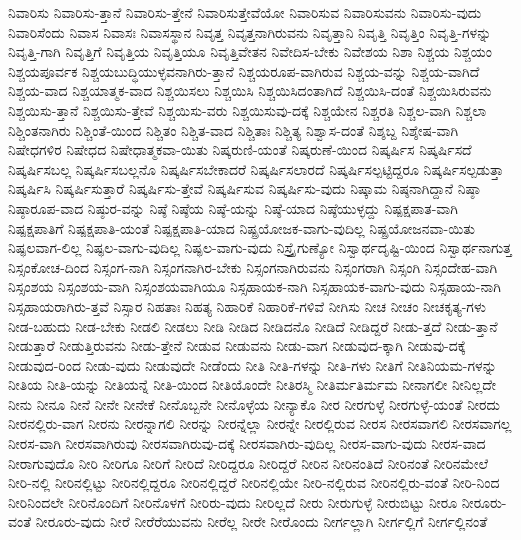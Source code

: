 {ನಿವಾರಿಸು
ನಿವಾರಿಸು-ತ್ತಾನೆ
ನಿವಾರಿಸು-ತ್ತೇನೆ
ನಿವಾರಿಸುತ್ತೇವೆಯೋ
ನಿವಾರಿಸುವ
ನಿವಾರಿಸುವನು
ನಿವಾರಿಸು-ವುದು
ನಿವಾರಿಸೆಂದು
ನಿವಾಸ
ನಿವಾಸಃ
ನಿವಾಸಸ್ಥಾನ
ನಿವೃತ್ತ
ನಿವೃತ್ತನಾಗಿರುವನು
ನಿವೃತ್ತಾನಿ
ನಿವೃತ್ತಿ
ನಿವೃತ್ತಿಂ
ನಿವೃತ್ತಿ-ಗಳನ್ನು
ನಿವೃತ್ತಿ-ಗಾಗಿ
ನಿವೃತ್ತಿಗೆ
ನಿವೃತ್ತಿಯ
ನಿವೃತ್ತಿಯೂ
ನಿವೃತ್ತಿವೇತನ
ನಿವೇದಿಸ-ಬೇಕು
ನಿವೇಶಯ
ನಿಶಾ
ನಿಶ್ಚಯ
ನಿಶ್ಚಯಂ
ನಿಶ್ಚಯಪೂರ್ವಕ
ನಿಶ್ಚಯಬುದ್ಧಿಯುಳ್ಳವನಾಗಿರು-ತ್ತಾನೆ
ನಿಶ್ಚಯರೂಪ-ವಾಗಿರುವ
ನಿಶ್ಚಯ-ವನ್ನು
ನಿಶ್ಚಯ-ವಾಗಿದೆ
ನಿಶ್ಚಯ-ವಾದ
ನಿಶ್ಚಯಾತ್ಮಕ-ವಾದ
ನಿಶ್ಚಯಿಸಲು
ನಿಶ್ಚಯಿಸಿ
ನಿಶ್ಚಯಿಸಿದಂತಾಗಿದೆ
ನಿಶ್ಚಯಿಸಿ-ದಂತೆ
ನಿಶ್ಚಯಿಸಿರುವನು
ನಿಶ್ಚಯಿಸು-ತ್ತಾನೆ
ನಿಶ್ಚಯಿಸು-ತ್ತೇವೆ
ನಿಶ್ಚಯಿಸು-ವರು
ನಿಶ್ಚಯಿಸುವು-ದಕ್ಕೆ
ನಿಶ್ಚಯೇನ
ನಿಶ್ಚರತಿ
ನಿಶ್ಚಲ-ವಾಗಿ
ನಿಶ್ಚಲಾ
ನಿಶ್ಚಿಂತನಾಗಿರು
ನಿಶ್ಚಿಂತೆ-ಯಿಂದ
ನಿಶ್ಚಿತಂ
ನಿಶ್ಚಿತ-ವಾದ
ನಿಶ್ಚಿತಾಃ
ನಿಶ್ಚಿತ್ಯ
ನಿಶ್ವಾಸ-ದಂತೆ
ನಿಶ್ಶಬ್ದ
ನಿಶ್ಶೇಷ-ವಾಗಿ
ನಿಷೇಧಗಳಿರ
ನಿಷೇಧದ
ನಿಷೇಧಾತ್ಮಕವಾ-ಯಿತು
ನಿಷ್ಕರುಣಿ-ಯಂತೆ
ನಿಷ್ಕರುಣೆ-ಯಿಂದ
ನಿಷ್ಕರ್ಷಿಸ
ನಿಷ್ಕರ್ಷಿಸದೆ
ನಿಷ್ಕರ್ಷಿಸಬಲ್ಲ
ನಿಷ್ಕರ್ಷಿಸಬಲ್ಲನೊ
ನಿಷ್ಕರ್ಷಿಸಬೇಕಾದರೆ
ನಿಷ್ಕರ್ಷಿಸಲಾರದೆ
ನಿಷ್ಕರ್ಷಿಸಲ್ಪಟ್ಟಿದ್ದರೂ
ನಿಷ್ಕರ್ಷಿಸಲ್ಪಡುತ್ತಾ
ನಿಷ್ಕರ್ಷಿಸಿ
ನಿಷ್ಕರ್ಷಿಸುತ್ತಾರೆ
ನಿಷ್ಕರ್ಷಿಸು-ತ್ತೇವೆ
ನಿಷ್ಕರ್ಷಿಸುವ
ನಿಷ್ಕರ್ಷಿಸು-ವುದು
ನಿಷ್ಕಾಮ
ನಿಷ್ಠನಾಗಿದ್ದಾನೆ
ನಿಷ್ಠಾ
ನಿಷ್ಠಾರೂಪ-ವಾದ
ನಿಷ್ಠುರ-ವನ್ನು
ನಿಷ್ಠೆ
ನಿಷ್ಠೆಯ
ನಿಷ್ಠೆ-ಯನ್ನು
ನಿಷ್ಠೆ-ಯಾದ
ನಿಷ್ಠೆಯುಳ್ಳದ್ದು
ನಿಷ್ಪಕ್ಷಪಾತ-ವಾಗಿ
ನಿಷ್ಪಕ್ಷಪಾತಿಗೆ
ನಿಷ್ಪಕ್ಷಪಾತಿ-ಯಂತೆ
ನಿಷ್ಪಕ್ಷಪಾತಿ-ಯಾದ
ನಿಷ್ಪ್ರಯೋಜಕ-ವಾಗು-ವುದಿಲ್ಲ
ನಿಷ್ಪ್ರಯೋಜನವಾ-ಯಿತು
ನಿಷ್ಫಲವಾಗ-ಲಿಲ್ಲ
ನಿಷ್ಫಲ-ವಾಗು-ವುದಿಲ್ಲ
ನಿಷ್ಫಲ-ವಾಗು-ವುದು
ನಿಸ್ತ್ರೈಗುಣ್ಯೋ
ನಿಸ್ವಾರ್ಥದೃಷ್ಟಿ-ಯಿಂದ
ನಿಸ್ವಾರ್ಥನಾಗುತ್ತ
ನಿಸ್ಸಂಕೋಚ-ದಿಂದ
ನಿಸ್ಸಂಗ-ನಾಗಿ
ನಿಸ್ಸಂಗನಾಗಿರ-ಬೇಕು
ನಿಸ್ಸಂಗನಾಗಿರುವನು
ನಿಸ್ಸಂಗರಾಗಿ
ನಿಸ್ಸಂಗಿ
ನಿಸ್ಸಂದೇಹ-ವಾಗಿ
ನಿಸ್ಸಂಶಯ
ನಿಸ್ಸಂಶಯ-ವಾಗಿ
ನಿಸ್ಸಂಶಯವಾಗಿಯೂ
ನಿಸ್ಸಹಾಯಕ-ನಾಗಿ
ನಿಸ್ಸಹಾಯಕ-ವಾಗು-ವುದು
ನಿಸ್ಸಹಾಯ-ನಾಗಿ
ನಿಸ್ಸಹಾಯರಾಗಿರು-ತ್ತವೆ
ನಿಸ್ಸಾರ
ನಿಹತಾಃ
ನಿಹತ್ಯ
ನಿಹಾರಿಕೆ
ನಿಹಾರಿಕೆ-ಗಳಿವೆ
ನೀಗಿಸು
ನೀಚ
ನೀಚಂ
ನೀಚಕೃತ್ಯ-ಗಳು
ನೀಡ-ಬಹುದು
ನೀಡ-ಬೇಕು
ನೀಡಲಿ
ನೀಡಲು
ನೀಡಿ
ನೀಡಿದ
ನೀಡಿದನೊ
ನೀಡಿದೆ
ನೀಡಿದ್ದರೆ
ನೀಡು-ತ್ತದೆ
ನೀಡು-ತ್ತಾನೆ
ನೀಡುತ್ತಾರೆ
ನೀಡುತ್ತಿರುವನು
ನೀಡು-ತ್ತೇನೆ
ನೀಡುವ
ನೀಡುವನು
ನೀಡು-ವಾಗ
ನೀಡುವುದ-ಕ್ಕಾಗಿ
ನೀಡುವು-ದಕ್ಕೆ
ನೀಡುವುದ-ರಿಂದ
ನೀಡು-ವುದು
ನೀಡುವುದೇ
ನೀಡೆಂದು
ನೀತಿ
ನೀತಿ-ಗಳನ್ನು
ನೀತಿ-ಗಳು
ನೀತಿಗೆ
ನೀತಿನಿಯಮ-ಗಳನ್ನು
ನೀತಿಯ
ನೀತಿ-ಯನ್ನು
ನೀತಿಯನ್ನೆ
ನೀತಿ-ಯಿಂದ
ನೀತಿಯೊಂದೇ
ನೀತಿರಸ್ಮಿ
ನೀತಿರ್ಮತಿರ್ಮಮ
ನೀನಾಗಲೀ
ನೀನಿಲ್ಲದೇ
ನೀನು
ನೀನೂ
ನೀನೆ
ನೀನೇ
ನೀನೇಕೆ
ನೀನೊಬ್ಬನೇ
ನೀನೊಳ್ಳೆಯ
ನೀನ್ಯಾಕೊ
ನೀರ
ನೀರಗುಳ್ಳೆ
ನೀರಗುಳ್ಳೆ-ಯಂತೆ
ನೀರದು
ನೀರನಲ್ಲಿರು-ವಾಗ
ನೀರನು
ನೀರನ್ನಾಗಲಿ
ನೀರನ್ನು
ನೀರನ್ನೆಲ್ಲಾ
ನೀರನ್ನೇ
ನೀರಲ್ಲಿರುವ
ನೀರಸ
ನೀರಸವಾಗಲಿ
ನೀರಸವಾಗಲ್ಲ
ನೀರಸ-ವಾಗಿ
ನೀರಸವಾಗಿರುವು
ನೀರಸವಾಗಿರುವು-ದಕ್ಕೆ
ನೀರಸವಾಗಿರು-ವುದಿಲ್ಲ
ನೀರಸ-ವಾಗು-ವುದು
ನೀರಸ-ವಾದ
ನೀರಾಗುವುದೊ
ನೀರಿ
ನೀರಿಗೂ
ನೀರಿಗೆ
ನೀರಿದೆ
ನೀರಿದ್ದರೂ
ನೀರಿದ್ದರೆ
ನೀರಿನ
ನೀರಿನಂತಿದೆ
ನೀರಿನಂತೆ
ನೀರಿನಮೇಲೆ
ನೀರಿ-ನಲ್ಲಿ
ನೀರಿನಲ್ಲಿಟ್ಟು
ನೀರಿನಲ್ಲಿದ್ದರೂ
ನೀರಿನಲ್ಲಿದ್ದರೆ
ನೀರಿನಲ್ಲಿಯೇ
ನೀರಿ-ನಲ್ಲಿರುವ
ನೀರಿನಲ್ಲಿರು-ವಂತೆ
ನೀರಿ-ನಿಂದ
ನೀರಿನಿಂದಲೇ
ನೀರಿನೊಂದಿಗೆ
ನೀರಿನೊಳಗೆ
ನೀರಿರು-ವುದು
ನೀರಿಲ್ಲದೆ
ನೀರು
ನೀರುಗುಳ್ಳೆ
ನೀರುಬಿಟ್ಟು
ನೀರೂ
ನೀರೂರು-ವಂತೆ
ನೀರೂರು-ವುದು
ನೀರೆ
ನೀರೆರೆಯುವನು
ನೀರೆಲ್ಲ
ನೀರೇ
ನೀರೊಂದು
ನೀರ್ಗಲ್ಲಾಗಿ
ನೀರ್ಗಲ್ಲಿಗೆ
ನೀರ್ಗಲ್ಲಿನಂತೆ
}
